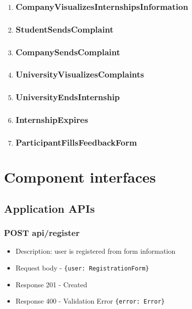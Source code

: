\begin{enumerate}[label=\textbf{RV\arabic* -}]
\item \subsubsection{CompanyVisualizesInternshipsInformation}
\item \subsubsection{StudentSendsComplaint}
\item \subsubsection{CompanySendsComplaint}
\item \subsubsection{UniversityVisualizesComplaints}
\item \subsubsection{UniversityEndsInternship}
\item \subsubsection{InternshipExpires}
\item \subsubsection{ParticipantFillsFeedbackForm}

\end{enumerate}

\section{Component interfaces}

\subsection{Application APIs}

\subsubsection{POST api/register}
\begin{itemize}
    \item Description: user is registered from form information
    \item Request body - \verb|{user: RegistrationForm}|
    \item Response 201 - Created
    \item Response 400 - Validation Error \verb|{error: Error}|
\end{itemize}

